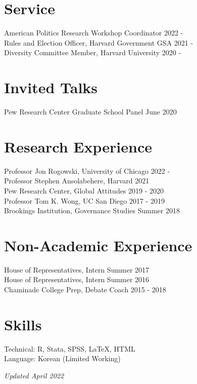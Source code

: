 \documentclass[margin, line]{res}
\begin{document}
\begin{resume}
\section{Service}
American Politics Research Workshop Coordinator \hfill 2022 - \\
Rules and Election Officer, Harvard Government GSA \hfill 2021 -\\
Diversity Committee Member, Harvard University \hfill 2020 -

\section{Invited Talks}
Pew Research Center Graduate School Panel \hfill June 2020

\section{Research Experience}
Professor Jon Rogowski, University of Chicago \hfill 2022 -\\
Professor Stephen Ansolabehere, Harvard \hfill 2021 \\
Pew Research Center, Global Attitudes \hfill 2019 - 2020\\
Professor Tom K. Wong, UC San Diego \hfill 2017 - 2019\\
Brookings Institution, Governance Studies \hfill Summer 2018

\section{Non-Academic Experience}
House of Representatives, Intern \hfill Summer 2017\\
House of Representatives, Intern \hfill Summer 2016\\
Chaminade College Prep, Debate Coach \hfill 2015 - 2018

\section{Skills}
Technical: R, Stata, SPSS, \LaTeX, HTML\\
Language: Korean (Limited Working)

\hfill \small{\textit{Updated April 2022}}

\end{resume}
\end{document}
